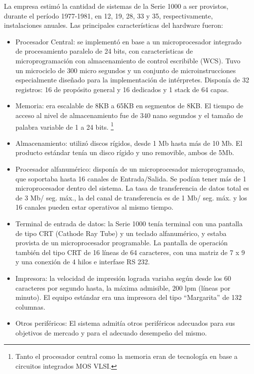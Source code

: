 \documentclass[%
 	final,
%
	notitlepage,
	narroweqnarray,
	inline,
 	twoside,
	]{ieee}
\begin{document}
La empresa estim\'o la cantidad de sistemas de la Serie 1000 a ser provistos, durante el per\'iodo 1977-1981, en 12, 19, 28, 33 y 35,
respectivamente, instalaciones anuales.
Las principales caracter\'isticas del hardware fueron:
\begin{itemize}
\item Procesador Central: se implement\'o en base a un microprocesador integrado de procesamiento paralelo de 24 bits, con caracter\'isticas de microprogramaci\'on con almacenamiento de control escribible (WCS). Tuvo un microciclo de 300 micro segundos y un conjunto de microinstrucciones especialmente dise\~nado para la implementaci\'on de int\'erpretes. Dispon\'ia de 32 registros: 16 de prop\'osito general y 16 dedicados y 1 stack de 64 capas.
\item Memoria: era escalable de 8KB a 65KB en segmentos de 8KB. El tiempo de acceso al nivel de almacenamiento fue de 340 nano segundos y el tama\~no de palabra variable de 1 a 24 bits.
\footnote{Tanto el procesador central como la memoria eran de tecnolog\'ia en base a circuitos integrados MOS VLSI.}
\item Almacenamiento: utiliz\'o discos r\'igidos, desde 1 Mb hasta m\'as de 10 Mb. El producto est\'andar ten\'ia un disco r\'igido y uno removible, ambos de 5Mb.
\item Procesador alfanum\'erico: dispon\'ia de un microprocesador microprogramado, que soportaba hasta 16 canales de Entrada/Salida. Se pod\'ian tener m\'as de 1 microprocesador dentro del sistema. La tasa de transferencia de datos total es de 3 Mb/ seg. m\'ax., la del canal de transferencia es de 1 Mb/ seg. m\'ax. y los 16 canales pueden estar operativos al mismo tiempo.
\item Terminal de entrada de datos: la Serie 1000 ten\'ia terminal con una pantalla de tipo CRT (Cathode Ray Tube) y un teclado alfanum\'erico, y estaba provista de un microprocesador programable. La pantalla de operaci\'on tambi\'en del tipo CRT de 16 l\'ineas de 64 caracteres, con una matriz de 7 x 9 y una conexi\'on de 4 hilos e interfase RS 232.
\item Impresora: la velocidad de impresi\'on lograda variaba seg\'un desde los 60 caracteres por segundo hasta, la m\'axima admisible, 200 lpm (l\'ineas por minuto). El equipo est\'andar era una impresora del tipo ``Margarita'' de 132 columnas.
\item Otros perif\'ericos: El sistema admit\'ia otros perif\'ericos adecuados para sus objetivos de mercado y para el adecuado desempe\~no del mismo.
\end{itemize}
\end{document}
